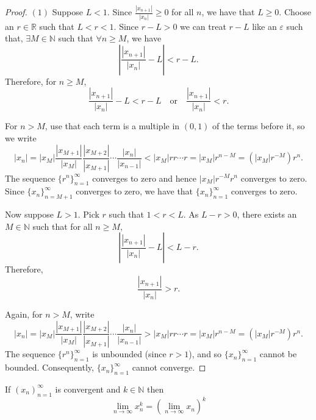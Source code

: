 \documentclass[../main.tex]{subfiles}
\begin{document}
    \begin{proof}
    \( (1) \) Suppose \( L < 1 \). Since \( \frac{|x_{n+1}|}{|x_n|} \geq 0 \) for all \( n \), we have that \( L \geq 0 \). Choose an \(r \in \mathbb{R}\) such that \( L < r < 1.\) Since \(r - L > 0\) we can treat \( r - L\) like an \( \varepsilon\) such that, \( \exists M \in \mathbb{N}\) such that \( \forall n \geq M\), we have
    \[
    \left| \frac{|x_{n+1}|}{|x_n|} - L \right| < r - L.
    \]
    Therefore, for \( n \geq M \),
    \[
    \frac{|x_{n+1}|}{|x_n|} - L < r - L \quad \text{or} \quad \frac{|x_{n+1}|}{|x_n|} < r.
    \]
    
    For \( n > M \), use that each term is a multiple in \((0,1)\) of the terms before it, so we write
    \[
    |x_n| = |x_M| \frac{|x_{M+1}|}{|x_M|} \frac{|x_{M+2}|}{|x_{M+1}|} \cdots \frac{|x_n|}{|x_{n-1}|} < |x_M| r r \cdots r = |x_M| r^{n-M} = (|x_M| r^{-M}) r^n.
    \]
    The sequence \( \{r^n\}_{n=1}^{\infty} \) converges to zero and hence \( |x_M| r^{-M} r^n \) converges to zero. Since \( \{x_n\}_{n=M+1}^{\infty} \) converges to zero, we have that \( \{x_n\}_{n=1}^{\infty} \) converges to zero.
    
    Now suppose \( L > 1 \). Pick \( r \) such that \( 1 < r < L \). As \( L - r > 0 \), there exists an \( M \in \mathbb{N} \) such that for all \( n \geq M \),
    \[
    \left| \frac{|x_{n+1}|}{|x_n|} - L \right| < L - r.
    \]
    Therefore,
    \[
    \frac{|x_{n+1}|}{|x_n|} > r.
    \]
    
    Again, for \( n > M \), write
    \[
    |x_n| = |x_M| \frac{|x_{M+1}|}{|x_M|} \frac{|x_{M+2}|}{|x_{M+1}|} \cdots \frac{|x_n|}{|x_{n-1}|} > |x_M| r r \cdots r = |x_M| r^{n-M} = (|x_M| r^{-M}) r^n.
    \]
    The sequence \( \{r^n\}_{n=1}^{\infty} \) is unbounded (since \( r > 1 \)), and so \( \{x_n\}_{n=1}^{\infty} \) cannot be bounded. Consequently, \( \{x_n\}_{n=1}^{\infty} \) cannot converge.   
    \end{proof}
    
    

    
    
    
    \begin{exercise}
    If $ (x_n)^\infty_{n=1}$ is convergent and $ k \in \mathbb{N}$ then
    \[
    \lim_{n \to \infty}{x_n^k} = \left( \lim_{n \to \infty}{x_n}\right)^k
    \]
    \end{exercise}
    
\end{document}
